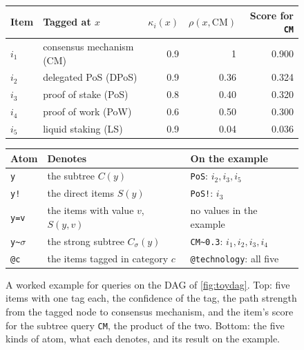 \begin{figure}[t]
  \centering
  \scriptsize
  \begin{tabular}{@{}llrrr@{}}
    \toprule
    Item & Tagged at $x$ & $\kappa_i(x)$ & $\rho(x, \mathrm{CM})$ & Score for \texttt{CM} \\
    \midrule
    $i_1$ & consensus mechanism (CM) & 0.9 & 1    & 0.900 \\
    $i_2$ & delegated PoS (DPoS)     & 0.9 & 0.36 & 0.324 \\
    $i_3$ & proof of stake (PoS)     & 0.8 & 0.40 & 0.320 \\
    $i_4$ & proof of work (PoW)      & 0.6 & 0.50 & 0.300 \\
    $i_5$ & liquid staking (LS)      & 0.9 & 0.04 & 0.036 \\
    \bottomrule
  \end{tabular}
  \par\vspace{4pt}
  \begin{tabular}{@{}lll@{}}
    \toprule
    Atom & Denotes & On the example \\
    \midrule
    \texttt{y}                         & the subtree $C(y)$                  & \texttt{PoS}: $i_2, i_3, i_5$ \\
    \texttt{y!}                        & the direct items $S(y)$             & \texttt{PoS!}: $i_3$ \\
    \texttt{y=v}                       & the items with value $v$, $S(y, v)$ & no values in the example \\
    \texttt{y\textasciitilde}$\sigma$  & the strong subtree $C_\sigma(y)$    & \texttt{CM\textasciitilde 0.3}: $i_1, i_2, i_3, i_4$ \\
    \texttt{@c}                        & the items tagged in category $c$    & \texttt{@technology}: all five \\
    \bottomrule
  \end{tabular}
  \caption{A worked example for queries on the DAG of \cref{fig:toydag}.
  Top: five items with one tag each, the confidence of the tag, the path
  strength from the tagged node to consensus mechanism, and the item's score
  for the subtree query \texttt{CM}, the product of the two. Bottom: the five
  kinds of atom, what each denotes, and its result on the example.}
  \label{fig:toyquery}
\end{figure}

